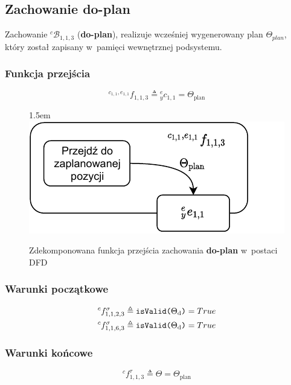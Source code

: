 \subsection{Zachowanie do-plan}
\label{subsec:cs-do-plan}
Zachowanie ${}^{c}\mathcal{B}_{1,1,3}$ (\textbf{do-plan}), realizuje wcześniej wygenerowany plan $\Theta_{plan}$, który został zapisany w~pamięci wewnętrznej podsystemu.

\subsubsection{Funkcja przejścia}
\begin{equation}
    {}^{c_{1,1}, e_{1,1}}f_{1,1,3} \triangleq {}^{e}_{y}c_{1,1} = \Theta_{\mathrm{plan}}
\end{equation}

\begin{figure}[ht]
    \leftskip1.5em
    \includegraphics[width=\columnwidth]{figures/ISR-cs-fp-do-plan.pdf}
    \caption{Zdekomponowana funkcja przejścia zachowania \textbf{do-plan} w~postaci DFD}
    \label{fig:cs-fp-do-plan}
\end{figure}

\subsubsection{Warunki początkowe}
\begin{equation}
    \begin{gathered}
        {}^{c}f^{\sigma}_{1,1,2,3} \triangleq \text{\texttt{isValid($\Theta_{\mathrm{d}}$)}} = True \\
        {}^{c}f^{\sigma}_{1,1,6,3} \triangleq \text{\texttt{isValid($\Theta_{\mathrm{d}}$)}} = True        
    \end{gathered}
\end{equation}

\subsubsection{Warunki końcowe}
\begin{equation}
    {}^{c}f^{\tau}_{1,1,3} \triangleq \Theta = \Theta_{\mathrm{plan}}
\end{equation}



